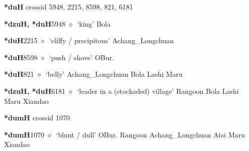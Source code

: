 \textbf{*duH}
  {\tiny crossid 5948, 2215, 8598, 821, 6181}
  \begin{list}{}{\leftmargin=1.5em \itemindent=-1.5em}
  \item {\footnotesize \textbf{*dzuH, *duH}}{\tiny 5948}
         $\diamond$~`king'
         Bola 
  \item {\footnotesize \textbf{*duH}}{\tiny 2215}
\hspace{1ex}
         $\diamond$~`cliffy / precipitous'
         Achang\_Longchuan 
  \item {\footnotesize \textbf{*duH}}{\tiny 8598}
\hspace{1ex}
         $\diamond$~`push / shove'
         OBur. 
  \item {\footnotesize \textbf{*duH}}{\tiny 821}
\hspace{1ex}
         $\diamond$~`belly'
         Achang\_Longchuan 
\hspace{1ex}
         Bola 
\hspace{1ex}
         Lashi 
\hspace{1ex}
         Maru 
  \item {\footnotesize \textbf{*dzuH, *duH}}{\tiny 6181}
\hspace{1ex}
         $\diamond$~`leader in a (stockaded) village'
         Rangoon 
\hspace{1ex}
         Bola 
\hspace{1ex}
         Lashi 
\hspace{1ex}
         Maru 
\hspace{1ex}
         Xiandao 
  \end{list}
\item
\textbf{*dumH}
  {\tiny crossid 1070}
  \begin{list}{}{\leftmargin=1.5em \itemindent=-1.5em}
  \item {\footnotesize \textbf{*dumH}}{\tiny 1070}
         $\diamond$~`blunt / dull'
         OBur. 
\hspace{1ex}
         Rangoon 
\hspace{1ex}
         Achang\_Longchuan 
\hspace{1ex}
         Atsi 
\hspace{1ex}
         Maru 
\hspace{1ex}
         Xiandao 
  \end{list}
